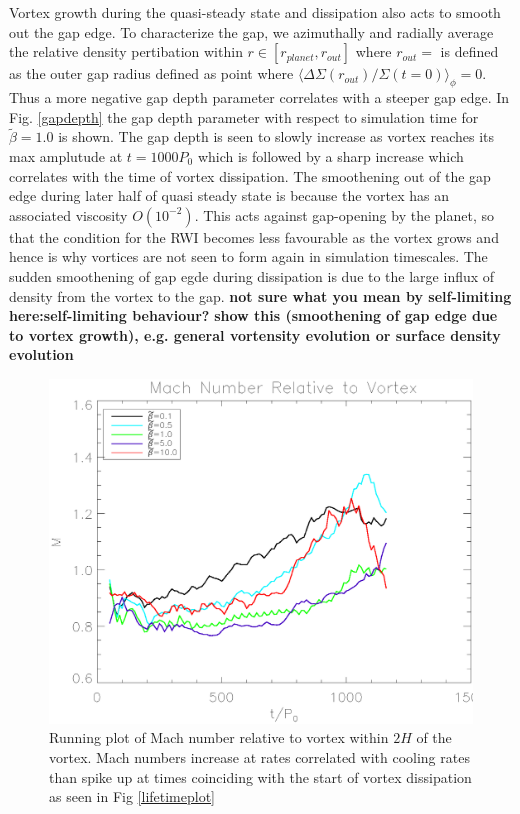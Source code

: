 Vortex growth during the quasi-steady state and dissipation also acts to smooth
out the gap edge. To characterize the gap, we azimuthally and radially average
the relative density pertibation within $r\in[r_{planet},r_{out}]$ where
 $r_{out}=$ is defined as the outer gap radius defined as point where
$\langle\Delta \Sigma(r_{out})/\Sigma(t=0)\rangle_{\phi}=0$. Thus a more 
negative gap depth parameter correlates with a steeper gap edge. In
 Fig. \ref{gapdepth} the gap depth parameter with respect to simulation time
for $\tilde\beta=1.0$ is shown. The gap depth is seen to slowly increase as
vortex reaches its max amplutude at $t=1000P_0$ which is followed by a sharp
increase which correlates with the time of vortex dissipation.
The smoothening out of the gap edge during later half of quasi steady state
 is because the vortex has an associated viscosity $O(10^{-2})$.
 This acts
against gap-opening by the planet, so that the condition for the RWI
becomes less favourable as the vortex grows and hence is why vortices are not
seen to form again in simulation timescales.
The sudden smoothening of gap egde during dissipation is due to the large
influx of density from the vortex to the gap.
{\bf not sure what you mean by self-limiting here:self-limiting
  behaviour?} 
{\bf show this (smoothening of gap edge due to vortex growth),
  e.g. general vortensity evolution or surface density 
  evolution}

\begin{figure}
    \includegraphics[width=\linewidth]{figures/mach}
 \caption{Running plot of Mach number relative to vortex within $2H$ of the
 vortex. Mach numbers increase at rates correlated with cooling rates than
 spike up at times coinciding with the start of vortex dissipation as seen in
 Fig \ref{lifetimeplot}} \label{machplot}
\end{figure}

